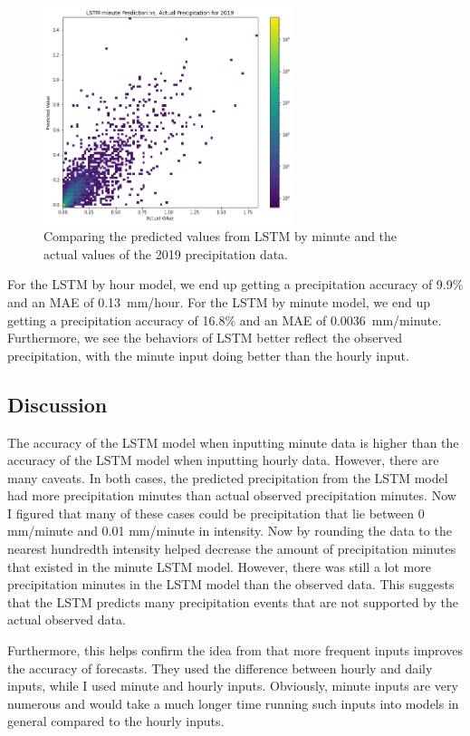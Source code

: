 \documentclass[11pt]{report}
\begin{document}
\begin{figure}[bh!]
	\centering
	\includegraphics[width = 0.65\textwidth]{Figures/LSTM_minute_compare.png}
	\caption[LSTM minute prediction vs. actual data ]{\label{LSTM_minute_compare}
		Comparing the predicted values from LSTM by minute and the actual values of the 2019 precipitation data.
	}
\end{figure}
\clearpage
For the LSTM by hour model, we end up getting a precipitation accuracy of 9.9\% and an MAE of 0.13~mm/hour. For the LSTM by minute model, we end up getting a precipitation accuracy of 16.8\% and an MAE of 0.0036~mm/minute. Furthermore, we see the behaviors of LSTM better reflect the observed precipitation, with the minute input doing better than the hourly input.  

\subsection{Discussion}
The accuracy of the LSTM model when inputting minute data is higher than the accuracy of the LSTM model when inputting hourly data. However, there are many caveats. In both cases, the predicted precipitation from the LSTM model had more precipitation minutes than actual observed precipitation minutes. Now I figured that many of these cases could be precipitation that lie between 0 mm/minute and 0.01 mm/minute in intensity. Now by rounding the data to the nearest hundredth intensity helped decrease the amount of precipitation minutes that existed in the minute LSTM model. However, there was still a lot more precipitation minutes in the LSTM model than the observed data. This suggests that the LSTM predicts many precipitation events that are not supported by the actual observed data. 

Furthermore, this helps confirm the idea from \cite{CNN} that more frequent inputs improves the accuracy of forecasts. They used the difference between hourly and daily inputs, while I used minute and hourly inputs. Obviously, minute inputs are very numerous and would take a much longer time running such inputs into models in general compared to the hourly inputs. 
\end{document}
